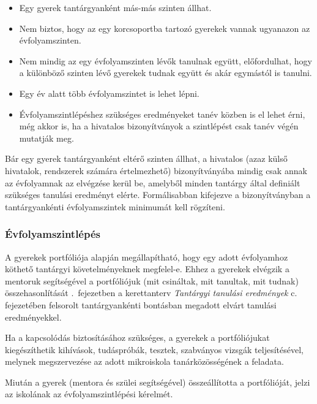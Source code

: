 \begin{itemize}
      \item Egy gyerek tantárgyanként más-más szinten állhat.
      \item Nem biztos, hogy az egy korcsoportba tartozó gyerekek
        vannak\linebreak
        ugyanazon az évfolyamszinten.

      \item Nem mindig az egy évfolyamszinten lévők tanulnak együtt, előfordulhat, hogy a különböző szinten lévő gyerekek tudnak együtt és akár egymástól is tanulni.

      \item Egy év alatt több évfolyamszintet is lehet lépni.
      \item Évfolyamszintlépéshez szükséges eredményeket tanév közben is el lehet érni, még akkor is, ha a hivatalos bizonyítványok a szintlépést csak tanév végén mutatják meg.
\end{itemize}

Bár egy gyerek tantárgyanként eltérő szinten állhat, a hivatalos (azaz külső hivatalok, rendszerek számára értelmezhető) bizonyítványába mindig csak annak az évfolyamnak az elvégzése kerül be, amelyből minden tantárgy által definiált szükséges tanulási eredményt elérte. Formálisabban kifejezve a bizonyítványban a tantárgyankénti évfolyamszintek minimumát kell rögzíteni.

\subsubsection{Évfolyamszintlépés}
\label{sec:evfolyamszintlepes}
A gyerekek portfóliója alapján megállapítható, hogy egy adott évfolyamhoz köthető tantárgyi követelményeknek megfelel-e. Ehhez a gyerekek elvégzik a mentoruk segítségével a portfóliójuk (mit csináltak, mit tanultak, mit tudnak) összehasonlítását \ifkerettanterv
      .~fejezetben
\else
      a kerettanterv \emph{Tantárgyi tanulási eredmények} c. fejezetében
\fi felsorolt tantárgyankénti bontásban megadott elvárt tanulási eredményekkel.

Ha a kapcsolódás biztosításához szükséges, a gyerekek a portfóliójukat kiegészíthetik kihívások, tudáspróbák, tesztek, szabványos vizsgák teljesítésével, melynek megszervezése az adott mikroiskola tanárközösségének a feladata.

Miután a gyerek (mentora és szülei segítségével) összeállította a port\-fó\-lió\-ját, jelzi az iskolának az évfolyamszintlépési kérelmét.

